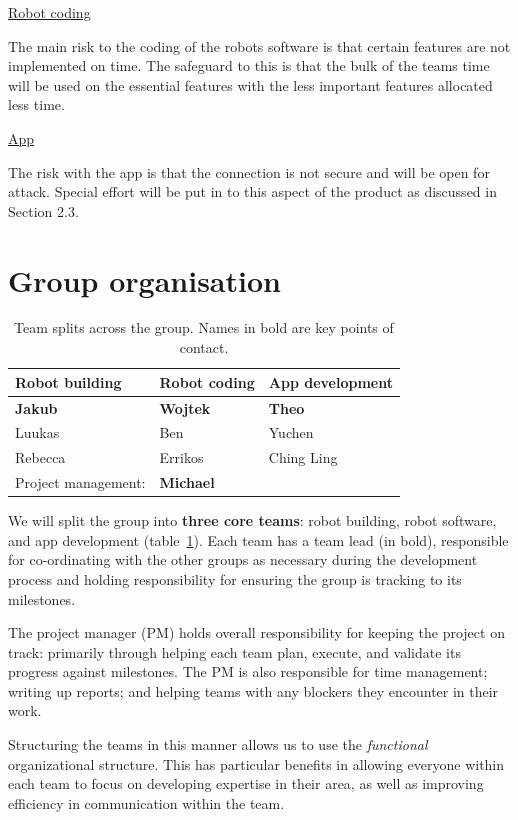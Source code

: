 \documentclass{article}
\begin{document}
\underline{Robot coding}

The main risk to the coding of the robots software is that certain features are not implemented on time. The safeguard to this is that the bulk of the teams time will be used on the essential features with the less important features allocated less time.

\underline{App}

The risk with the app is that the connection is not secure and will be open for attack. Special effort will be put in to this aspect of the product as discussed in Section 2.3.

\section{Group organisation}
\begin{table}[]
  \begin{tabular}{lll}
    \hline
    Robot building & Robot coding & App development   \\
    \hline
    {\bf Jakub}          & {\bf Wojtek}       & {\bf Theo}              \\
    Luukas         & Ben          & Yuchen            \\
    Rebecca        & Errikos      & Ching Ling \\
    \hline
    Project management: & {\bf Michael} & \\
  \end{tabular}
  \caption{Team splits across the group. Names in bold are key points of contact.}
  \label{tab:group-split}
\end{table}

We will split the group into {\bf three core teams}: robot building, robot software, and app development (table~\ref{tab:group-split}). Each team has a team lead (in bold), responsible for co-ordinating with the other groups as necessary during the development process and holding responsibility for ensuring the group is tracking to its milestones.

The project manager (PM) holds overall responsibility for keeping the project on track: primarily through helping each team plan, execute, and validate its progress against milestones. The PM is also responsible for time management; writing up reports; and helping teams with any blockers they encounter in their work.

Structuring the teams in this manner allows us to use the {\it functional} organizational structure. This has particular benefits in allowing everyone within each team to focus on developing expertise in their area, as well as improving efficiency in communication within the team.
\end{document}
